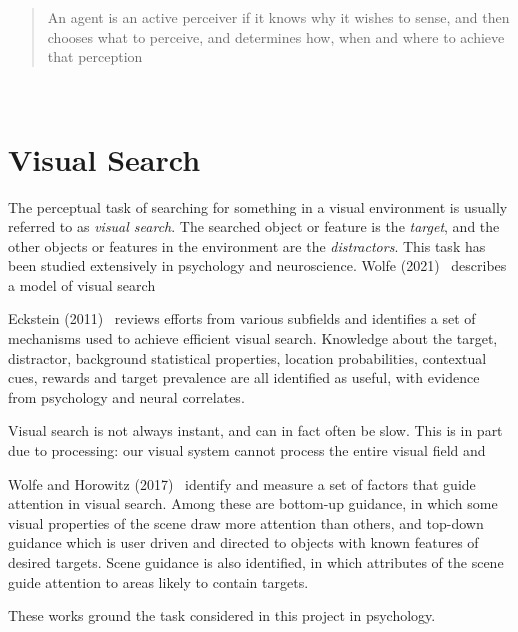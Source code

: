 \begin{quote}
    An agent is an active perceiver if it knows why it wishes to sense, and then chooses what to perceive, and determines how, when and where to achieve that perception
\end{quote}~\cite{bajcsy_aloimonos_tsotsos_2018}


\section{Visual Search}

The perceptual task of searching for something in a visual environment is usually referred to as \textit{visual search}. The searched object or feature is the \textit{target}, and the other objects or features in the environment are the \textit{distractors}. This task has been studied extensively in psychology and neuroscience. Wolfe (2021)~\cite{wolfe_guided_2021} describes a model of visual search


Eckstein (2011)~\cite{eckstein_visual_2011} reviews efforts from various subfields and identifies a set of mechanisms used to achieve efficient visual search. Knowledge about the target, distractor, background statistical properties, location probabilities, contextual cues, rewards and target prevalence are all identified as useful, with evidence from psychology and neural correlates.

Visual search is not always instant, and can in fact often be slow. This is in part due to processing: our visual system cannot process the entire visual field and 


Wolfe and Horowitz (2017)~\cite{wolfe_horowitz_2017} identify and measure a set of factors that guide attention in visual search. Among these are bottom-up guidance, in which some visual properties of the scene draw more attention than others, and top-down guidance which is user driven and directed to objects with known features of desired targets. Scene guidance is also identified, in which attributes of the scene guide attention to areas likely to contain targets. 

These works ground the task considered in this project in psychology.

